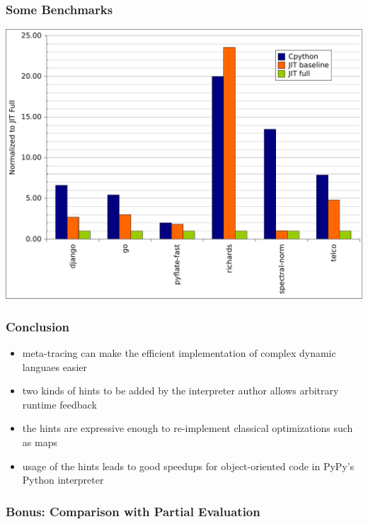 \documentclass[utf8x]{beamer}
\begin{document}
\begin{frame}
  \frametitle{Some Benchmarks}
  \includegraphics[scale=0.5]{figures/bench.pdf}
\end{frame}

\begin{frame}
  \frametitle{Conclusion}
  \begin{itemize}
      \item meta-tracing can make the efficient implementation of complex dynamic languaes easier
      \item two kinds of hints to be added by the interpreter author allows arbitrary runtime feedback
      \item the hints are expressive enough to re-implement classical optimizations such as maps
      \item usage of the hints leads to good speedups for object-oriented code in PyPy's Python interpreter
  \end{itemize}
\end{frame}

\begin{frame}
  \frametitle{Bonus: Comparison with Partial Evaluation}
\end{frame}
\end{document}
